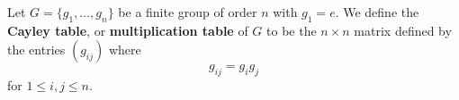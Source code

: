 \begin{definition}
  Let $G=\{g_1, \dots, g_n\}$ be a finite group of order $n$ with $g_1=e$. We
  define the \textbf{Cayley table}, or \textbf{multiplication table} of $G$ to
  be the  $n \times n$ matrix defined by the entries $(g_{ij})$ where
  \begin{equation*}
    g_{ij}=g_ig_j
  \end{equation*}
  for $1 \leq i,j \leq n$.
\end{definition}

